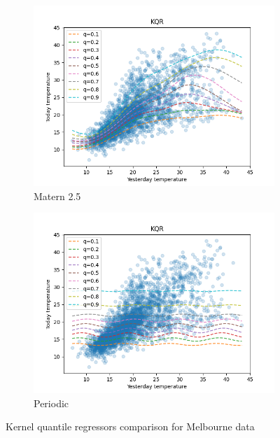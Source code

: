 \begin{figure}[!h]
    \begin{subfigure}[b]{0.5\linewidth}
        \centering
        \includegraphics[width=1.1\textwidth]{images/melborune_matern_2.5_kernel_quantile_regression.png}
        \caption{Matern 2.5} 
        \label{} 
    \end{subfigure} 
    \begin{subfigure}[b]{0.5\linewidth}
        \centering
        \includegraphics[width=1.1\textwidth]{images/melborune_periodic_kernel_quantile_regression.png}
        \caption{Periodic} 
        \label{} 
    \end{subfigure} 
    \caption{Kernel quantile regressors comparison for Melbourne data}
    \label{fig:kernel quantile regressors comparison} 
\end{figure}

